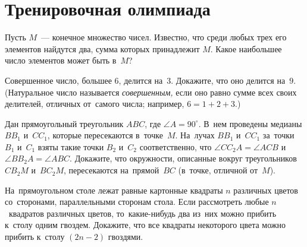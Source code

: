 
\section*{Тренировочная олимпиада}


\begin{problems}

\item
Пусть $M$~--- конечное множество чисел.
Известно, что среди любых трех его элементов найдутся два, сумма которых
принадлежит $M$.
Какое наибольшее число элементов может быть в~$M$?

\item
Совершенное число, большее $6$, делится на~$3$.
Докажите, что оно делится на~$9$.
(Натуральное число называется \emph{совершенным,} если оно равно сумме всех
своих делителей, отличных от~самого числа; например, $6 = 1 + 2 + 3$.)

\item
Дан прямоугольный треугольник $ABC$, где $\angle{A} = 90^{\circ}$.
В~нем проведены медианы $B B_1$ и~$C C_1$, которые пересекаются в~точке~$M$.
На~лучах $B B_1$ и~$C C_1$ за~точки $B_1$ и~$C_1$ взяты такие точки
$B_2$ и~$C_2$ соответственно, что $\angle{C C_2 A} = \angle{ACB}$
и~$\angle{B B_2 A} = \angle{ABC}$.
Докажите, что окружности, описанные вокруг треугольников $C B_2 M$ и~$B C_2 M$,
пересекаются на~прямой~$BC$ (в~точке, отличной от~$M$).

\item
На~прямоугольном столе лежат равные картонные квадраты $n$ различных цветов
со~сторонами, параллельными сторонам стола.
Если рассмотреть любые $n$~квадратов различных цветов, то~какие-нибудь два
из~них можно прибить к~столу одним гвоздем.
Докажите, что все квадраты некоторого цвета можно прибить к~столу
$(2 n - 2)$ гвоздями.

\end{problems}

